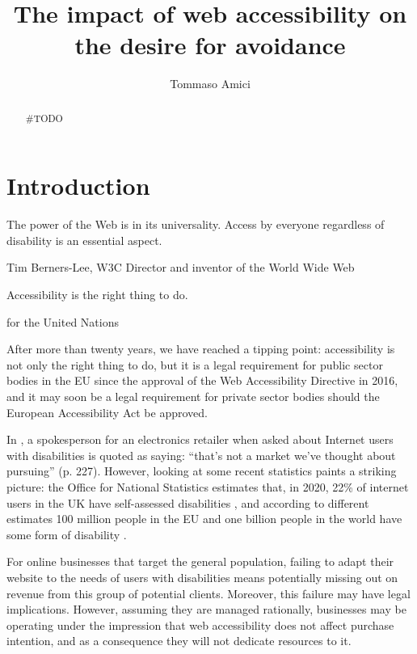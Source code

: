 \documentclass[12pt, a4paper]{article}
\title{The impact of web accessibility on the desire for avoidance}
\author{Tommaso Amici}
\begin{document}
\doublespacing
{}


\newpage


\begin{abstract}
  \#TODO
\end{abstract}
\newpage

\tableofcontents
\listoffigures
\listoftables
\newpage


\section{Introduction}

\epigraph{The power of the Web is in its universality. Access by everyone regardless
  of disability is an essential aspect.}{Tim Berners-Lee, W3C Director and inventor
  of the World Wide Web}

\epigraph{Accessibility is the right thing to do.}{ for the United Nations}

\noindent
After more than twenty years, we have reached a tipping point: accessibility is not only
the right thing to do, but it is a legal requirement for public sector bodies in the EU
since the approval of the Web Accessibility Directive in 2016, and it may soon be a legal
requirement for private sector bodies should the European Accessibility Act be approved.

In , a spokesperson for an electronics retailer when asked about
Internet users with disabilities is quoted as saying: ``that's not a market we've
thought about pursuing'' (p. 227). However, looking at some recent statistics paints a
striking picture: the Office for National Statistics estimates that, in 2020, 22\% of
internet users in the UK have self-assessed disabilities
\citeyear{ukinternetusers2020}, and according to different estimates 100 million people
in the EU and one billion people in the world have some form of disability
\cite{euWebAccessibility2021, whoDisability2021}.

For online businesses that target the general population, failing to adapt their
website to the needs of users with disabilities means potentially missing out on
revenue from this group of potential clients. Moreover, this failure may have legal
implications. However, assuming they are managed rationally, businesses may be
operating under the impression that web accessibility does not affect purchase
intention, and as a consequence they will not dedicate resources to it.
\end{document}
